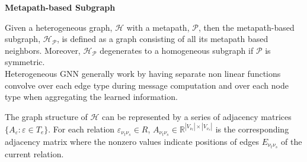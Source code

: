 \documentclass{report} %
\begin{document}
\textbf{Metapath-based Subgraph}

Given a heterogeneous graph, $\mathcal{H}$ with a metapath, $\mathcal{P}$, then the metapath-based subgraph, $\mathcal{H_P}$, is defined as a graph consisting of all 
its metapath based neighbors. Moreover, $\mathcal{H_P}$ degenerates to a homogeneous subgraph if $\mathcal{P}$ is symmetric.\\


Heterogeneous \ac{GNN} generally work by having separate non linear functions convolve over each edge type during message computation and over each node type when 
aggregating the learned information. 

The graph structure of $\mathcal{H}$  can be represented by a series of adjacency matrices \(\{A_\varepsilon : \varepsilon \in T_e\}\). 
For each relation \(\varepsilon_{\nu_t \nu_s} \in R\), \(A_{\nu_t \nu_s} \in \mathbb{R}^{|V_{\nu_t}| \times |V_{\nu_s}|}\) is the corresponding 
adjacency matrix where the nonzero values indicate positions of edges \(E_{\nu_t \nu_s}\) of the current relation.\\
\end{document}
